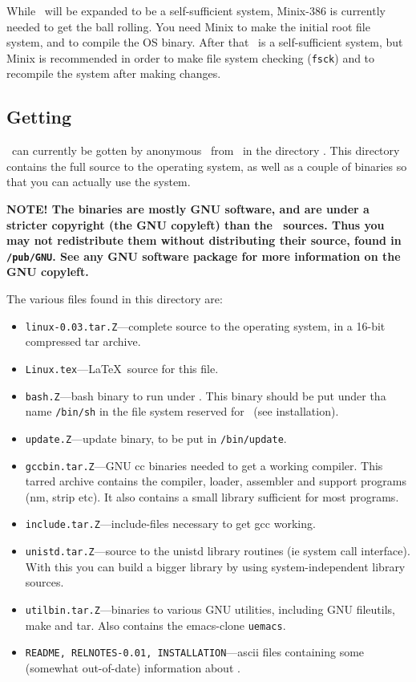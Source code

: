 While \Linux\ will be expanded to be a self-sufficient system, Minix-386
is currently needed to get the ball rolling. You need Minix to make the
initial root file system, and to compile the OS binary. After that
\Linux\ is a self-sufficient system, but Minix is recommended in order
to make file system checking ({\tt fsck}) and to recompile the system
after making changes.

\subsection{Getting \Linux}

\Linux\ can currently be gotten by anonymous \ftp\ from \nic\ in the
directory \dir. This directory contains the full source to the operating
system, as well as a couple of binaries so that you can actually use the
system.

{\vspace{\baselineskip}\bf NOTE! The binaries are mostly GNU software,
and are under a stricter copyright (the GNU copyleft) than the \Linux\
sources.  Thus you may not redistribute them without distributing their
source, found in {\tt/pub/GNU}. See any GNU software package for more
information on the GNU copyleft.\vspace{\baselineskip}}

The various files found in this directory are:
\begin{itemize}
\item{\tt linux-0.03.tar.Z}---complete source to the operating system,
in a 16-bit compressed tar archive.
\item{\tt Linux.tex}---\LaTeX\ source for this file.
\item{\tt bash.Z}---bash binary to run under \Linux. This binary should
be put under tha name {\tt/bin/sh} in the file system reserved for
\Linux\ (see installation).
\item{\tt update.Z}---update binary, to be put in {\tt/bin/update}.
\item{\tt gccbin.tar.Z}---GNU cc binaries needed to get a working
compiler. This tarred archive contains the compiler, loader, assembler
and support programs (nm, strip etc). It also contains a small library
sufficient for most programs.
\item{\tt include.tar.Z}---include-files necessary to get gcc working.
\item{\tt unistd.tar.Z}---source to the unistd library routines (ie
system call interface). With this you can build a bigger library by
using system-independent library sources.
\item{\tt utilbin.tar.Z}---binaries to various GNU utilities, including
GNU fileutils, make and tar. Also contains the emacs-clone {\tt uemacs}.
\item{\tt README, RELNOTES-0.01, INSTALLATION}---ascii files containing
some (somewhat out-of-date) information about \Linux.
\end{itemize}


